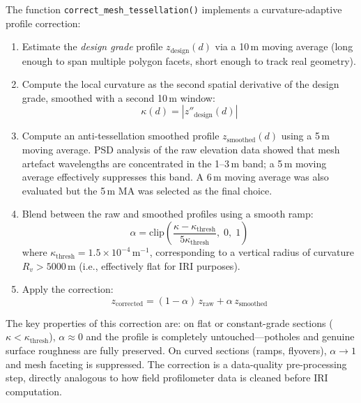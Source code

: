 \documentclass[conference]{IEEEtran}
\begin{document}
The function \texttt{correct\_mesh\_tessellation()} implements a curvature-adaptive profile correction:

\begin{enumerate}
    \item Estimate the \textit{design grade} profile $z_{\text{design}}(d)$ via a 10\,m moving average (long enough to span multiple polygon facets, short enough to track real geometry).
    \item Compute the local curvature as the second spatial derivative of the design grade, smoothed with a second 10\,m window:
    \begin{equation}
    \label{eq:curvature}
    \kappa(d) = \left| z''_{\text{design}}(d) \right|
    \end{equation}
    \item Compute an anti-tessellation smoothed profile $z_{\text{smoothed}}(d)$ using a 5\,m moving average.
PSD analysis of the raw elevation data showed that mesh artefact wavelengths are concentrated in the 1--3\,m band;
a 5\,m moving average effectively suppresses this band. A 6\,m moving average was also evaluated but the 5\,m MA was selected as the final choice.
    \item Blend between the raw and smoothed profiles using a smooth ramp:
    \begin{equation}
    \label{eq:alpha}
    \alpha = \text{clip}\!\left(\frac{\kappa - \kappa_{\text{thresh}}}{5\kappa_{\text{thresh}}},\; 0,\; 1\right)
    \end{equation}
    where $\kappa_{\text{thresh}} = 1.5 \times 10^{-4}\,\text{m}^{-1}$, corresponding to a vertical radius of curvature $R_v > 5000\,\text{m}$ (i.e., effectively flat for IRI purposes).
    \item Apply the correction:
    \begin{equation}
    \label{eq:correction}
    z_{\text{corrected}} = (1 - \alpha)\,z_{\text{raw}} + \alpha\,z_{\text{smoothed}}
    \end{equation}
\end{enumerate}

The key properties of this correction are: on flat or constant-grade sections ($\kappa < \kappa_{\text{thresh}}$), $\alpha \approx 0$ and the profile is completely untouched---potholes and genuine surface roughness are fully preserved.
On curved sections (ramps, flyovers), $\alpha \to 1$ and mesh faceting is suppressed.
The correction is a data-quality pre-processing step, directly analogous to how field profilometer data is cleaned before IRI computation.
\end{document}
